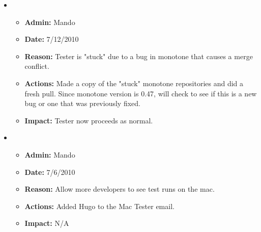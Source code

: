 \documentclass[12pt]{article}
\begin{document}
\begin{itemize}
\item 
\begin{itemize}
\item[] {\bf Admin:} Mando
\item[] {\bf Date:} 7/12/2010
\item[] {\bf Reason:} Tester is "stuck" due to a bug in monotone that causes a merge conflict.
\item[] {\bf Actions:} Made a copy of the "stuck" monotone repositories and did a fresh pull. Since monotone version is 0.47, will check to see if this is a new bug or one that was previously fixed.
\item[] {\bf Impact:} Tester now proceeds as normal. 
\end{itemize}

\item 
\begin{itemize}
\item[] {\bf Admin:} Mando
\item[] {\bf Date:} 7/6/2010
\item[] {\bf Reason:} Allow more developers to see test runs on the mac.
\item[] {\bf Actions:} Added Hugo to the Mac Tester email.
\item[] {\bf Impact:} N/A
\end{itemize}
\end{itemize}
\end{document}
